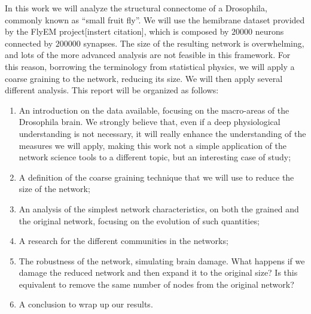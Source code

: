 In this work we will analyze the structural connectome of a Drosophila, commonly known as 
“small fruit fly”. We will use the hemibrane dataset provided by the FlyEM project[instert
citation], which is composed by $20000$ neurons connected by $200000$ synapses. The size
of the resulting network is overwhelming, and lots of the more advanced analysis are 
not feasible in this framework. For this reason, borrowing the terminology from statistical
physics, we will apply a coarse graining to the network, reducing its size. We will then 
apply several different analysis. This report will be organized as follows:
\begin{enumerate}
    \item An introduction on the data available, focusing on the macro-areas of the Drosophila
        brain. We strongly believe that, even if a deep physiological understanding is not 
        necessary, it will really enhance the understanding of the measures we will apply,
        making this work not a simple application of the network science tools to a different
        topic, but an interesting case of study;
    \item A definition of the coarse graining technique that we will use to reduce the size 
        of the network;
    \item An analysis of the simplest network characteristics, on both the grained and the 
        original network, focusing on the evolution of such quantities;
    \item A research for the different communities in the networks;
    \item The robustness of the network, simulating brain damage. What happens if we damage
        the reduced network and then expand it to the original size? Is this equivalent to 
        remove the same number of nodes from the original network?
    \item A conclusion to wrap up our results.
\end{enumerate}

